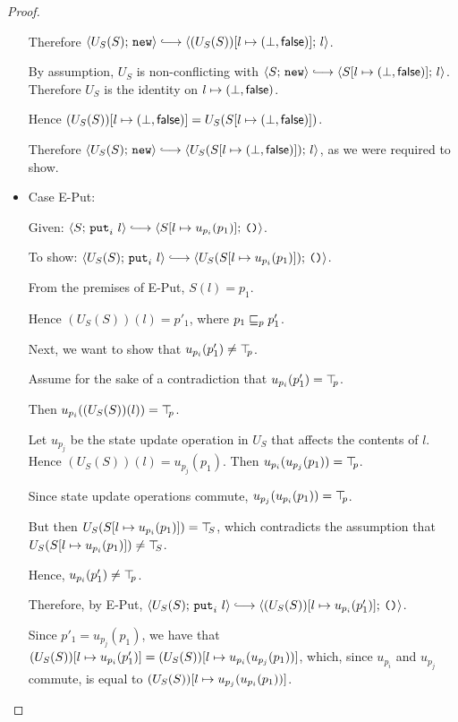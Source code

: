 \begin{proof}
\begin{itemize}
      Therefore $\config{U_S(S)}{\NEW} \parstepsto
      \config{\extS{(U_S(S))}{l}{\bot}{\frozenfalse}}{l}$.

      By assumption, $U_S$ is non-conflicting with $\config{S}{\NEW}
      \parstepsto \config{\extS{S}{l}{\bot}{\frozenfalse}}{l}$.
      Therefore $U_S$ is the identity on
      $l \mapsto (\bot, \textsf{false})$.

      Hence $(U_S(S))[l \mapsto (\bot, \textsf{false})] =
      U_S(S[l \mapsto (\bot, \textsf{false})])$.

      Therefore $\config{U_S(S)}{\NEW} \parstepsto
      \config{U_S(\extS{S}{l}{\bot}{\frozenfalse})}{l}$, as we were
      required to show.

    \item Case {\sc E-Put}:

      Given: $\config{S}{\putiexp{l}} \parstepsto
      \config{\extSRaw{S}{l}{u_{p_i}(p_1)}}{\unit}$.

      To show: $\config{U_S(S)}{\putiexp{l}} \parstepsto
      \config{U_S(\extSRaw{S}{l}{u_{p_i}(p_1)})}{\unit}$.

      From the premises of {\sc E-Put}, $S(l) = p_1$.

      Hence $(U_S(S))(l) = p'_1$, where $p_1 \sqsubseteq_p p'_1$.

      Next, we want to show that $u_{p_i}(p'_1) \neq \top\hspace{-0.85mm}_{p}$.

      Assume for the sake of a contradiction that $u_{p_i}(p'_1) =
      \top\hspace{-0.85mm}_{p}$.

      Then $u_{p_i}((U_S(S))(l)) = \top\hspace{-0.85mm}_{p}$.

      Let $u_{p_j}$ be the state update operation in $U_S$ that
      affects the contents of $l$.  Hence $(U_S(S))(l) =
      u_{p_j}(p_1)$. Then $u_{p_i}(u_{p_j}(p_1)) = \top\hspace{-0.85mm}_{p}$.

      Since state update operations commute, $u_{p_j}(u_{p_i}(p_1)) =
      \top\hspace{-0.85mm}_{p}$.
      
      But then $U_S(S[l \mapsto u_{p_i}(p_1)]) = \top\hspace{-0.85mm}_{S}$,
      which contradicts the assumption that
      $U_S(S[l \mapsto u_{p_i}(p_1)]) \neq \top\hspace{-0.85mm}_{S}$.

      Hence, $u_{p_i}(p'_1) \neq \top\hspace{-0.85mm}_{p}$.

      Therefore, by {\sc E-Put}, $\config{U_S(S)}{\putiexp{l}}
      \parstepsto
      \config{\extSRaw{(U_S(S))}{l}{u_{p_i}(p'_1)}}{\unit}$.

      Since $p'_1 = u_{p_j}(p_1)$, we have that
      $(U_S(S))[l \mapsto u_{p_i}(p'_1)] =
      (U_S(S))[l \mapsto u_{p_i}(u_{p_j}(p_1))]$, which, since
      $u_{p_i}$ and $u_{p_j}$ commute, is equal to
      $(U_S(S))[l \mapsto u_{p_j}(u_{p_i}(p_1))]$.


\end{itemize}
\end{proof}
